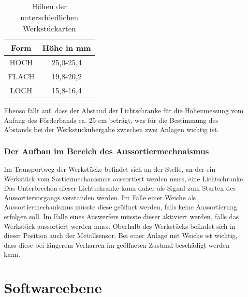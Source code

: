 \begin{table}[h]
    \begin{center}
        \begin{tabular}{ |c|c| }
            \hline
            Form                     & Höhe in mm \\
            \hline\hline
            HOCH                 &  25,0-25,4\\
            \hline
            FLACH                     & 19,8-20,2 \\
            \hline
            LOCH               & 15,8-16,4 \\
            \hline
        \end{tabular}
    \end{center}
    \caption{Höhen der unterschiedlichen Werkstückarten}
    \label{tab:werkstuecke}
\end{table}

Ebenso fällt auf, dass der Abstand der Lichtschranke für die Höhenmessung vom Anfang des Förderbands ca. 25 cm beträgt, 
was für die Bestimmung des Abstands bei der Werkstückübergabe zwischen zwei Anlagen wichtig ist.

\subsubsection{Der Aufbau im Bereich des Aussortiermechnaismus}

Im Transportweg der Werkstücke befindet sich an der Stelle, an der ein Werkstück vom Sortiermechanismus aussortiert
werden muss, eine Lichtschranke.
Das Unterbrechen dieser Lichtschranke kann daher als Signal zum Starten des Aussortiervorgangs verstanden werden.
Im Falle einer Weiche als Aussortiermechanismus müsste diese geöffnet werden, falls keine Aussortierung erfolgen soll.
Im Falle eines Auswerfers müsste dieser aktiviert werden, falls das Werkstück aussortiert werden muss.
Oberhalb des Werkstücks befindet sich in dieser Position auch der Metallsensor.
Bei einer Anlage mit Weiche ist wichtig, dass diese bei längerem Verharren im geöffneten Zustand beschädigt werden kann.

\section{Softwareebene}\label{sec:softwareebene}


